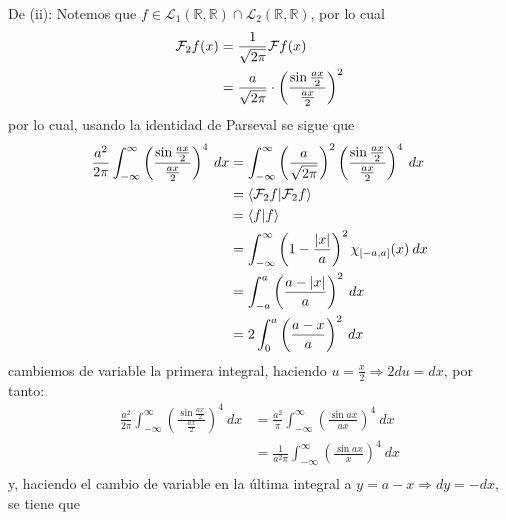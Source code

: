 \documentclass[12pt]{report}
\theoremstyle{largebreak}
\newcommand\abs[1]{\ensuremath{\left|#1\right|}}
\newcommand\pint[2]{\ensuremath{\langle#1| #2\rangle}}
\newcommand{\fou}[1]{\ensuremath{\mathcal{F}#1}}
\begin{document}
\begin{sol}
        De (ii): Notemos que $f\in\mathcal{L}_1(\mathbb{R},\mathbb{R})\cap\mathcal{L}_2(\mathbb{R},\mathbb{R})$, por lo cual
        \begin{equation*}
            \begin{split}
                \fou_2{f}(x)&=\frac{1}{\sqrt{2\pi}}\fou{f}(x)\\
                &=\frac{a}{\sqrt{2\pi}}\cdot\left(\frac{\sin\frac{ax}{2}}{\frac{ax}{2}}\right)^2\\
            \end{split}
        \end{equation*}
        por lo cual, usando la identidad de Parseval se sigue que
        \begin{equation*}
            \begin{split}
                \frac{a^2}{2\pi}\int_{ -\infty}^{\infty}\left(\frac{\sin\frac{ax}{2}}{\frac{ax}{2}} \right)^4\:dx&=\int_{ -\infty}^{\infty}\left(\frac{a}{\sqrt{2\pi}}\right)^2 \left(\frac{\sin\frac{ax}{2}}{\frac{ax}{2}} \right)^4\:dx\\
                &=\pint{\fou_2{f}}{\fou_2{f}}\\
                &=\pint{f}{f}\\
                &=\int_{-\infty}^\infty\left(1-\frac{\abs{x}}{a}\right)^2\chi_{[-a,a]}(x)\:dx\\
                &=\int_{-a}^a\left(\frac{a-\abs{x}}{a}\right)^2\:dx\\
                &=2\int_{0}^a\left(\frac{a-x}{a}\right)^2\:dx\\
            \end{split}
        \end{equation*}
        cambiemos de variable la primera integral, haciendo $u=\frac{x}{2}\Rightarrow 2du=dx$, por tanto:
        \begin{equation*}
            \begin{split}
                \frac{a^2}{2\pi}\int_{ -\infty}^{\infty}\left(\frac{\sin\frac{ax}{2}}{\frac{ax}{2}} \right)^4\:dx&=\frac{a^2}{\pi}\int_{ -\infty}^{\infty}\left(\frac{\sin ax}{ax}\right)^4\:dx\\
                &=\frac{1}{a^2\pi}\int_{ -\infty}^{\infty}\left(\frac{\sin ax}{x}\right)^4\:dx\\
            \end{split}
        \end{equation*}
        y, haciendo el cambio de variable en la última integral a $y=a-x\Rightarrow dy=-dx$, se tiene que 
        \begin{equation*}

\end{equation*}
\end{sol}
\end{document}
